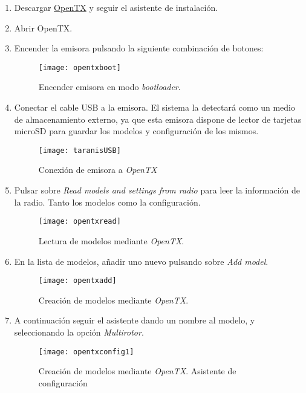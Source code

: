 \begin{enumerate}
\item Descargar \href{http://www.open-tx.org/downloads}{OpenTX} y seguir el asistente de instalación. 
\item Abrir OpenTX.
\item Encender la emisora pulsando la siguiente combinación de botones: 
 \begin{figure}[H]
	\centering
	\texttt{[image: opentxboot]}
	\caption[Emisora en modo bootloader]{Encender emisora en modo \emph{bootloader}.}\label{fig:opentxboot}
\end{figure}
\item Conectar el cable USB a la emisora. El sistema la detectará como un medio de almacenamiento externo, ya que esta emisora dispone de lector de tarjetas microSD para guardar los modelos y configuración de los mismos.

\begin{figure}[H]
	\centering
	\texttt{[image: taranisUSB]}
	\caption[Emisora conectada]{Conexión de emisora a \emph{OpenTX}}\label{fig:taranisUSB}
\end{figure}

\item Pulsar sobre \emph{Read models and settings from radio} para leer la información de la radio. Tanto los modelos como la configuración.
\begin{figure}[H]
	\centering
	\texttt{[image: opentxread]}
	\caption[Lectura de modelos OpenTX]{Lectura de modelos mediante \emph{OpenTX}.}\label{fig:opentxread}
\end{figure}

\item En la lista de modelos, añadir uno nuevo pulsando sobre \emph{Add model}.
\begin{figure}[H]
	\centering
	\texttt{[image: opentxadd]}
	\caption[Creación de modelos OpenTX]{Creación de modelos mediante \emph{OpenTX}.}\label{fig:opentxadd}
\end{figure}

\item A continuación seguir el asistente dando un nombre al modelo, y seleccionando la opción \emph{Multirotor}.
\begin{figure}[H]
	\centering
	\texttt{[image: opentxconfig1]}
	\caption[Creación de modelos OpenTX. 1]{Creación de modelos mediante \emph{OpenTX}. Asistente de configuración}\label{fig:opentxconfig1}
\end{figure}


\end{enumerate}
